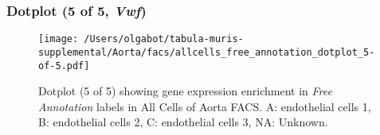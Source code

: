 \clearpage

\subsubsection{Dotplot (5 of 5, \emph{Vwf})}
\begin{figure}[h]
\centering
\texttt{[image: /Users/olgabot/tabula-muris-supplemental/Aorta/facs/allcells\_free\_annotation\_dotplot\_5-of-5.pdf]}

\caption{ Dotplot (5 of 5)  showing gene expression enrichment in \emph{Free Annotation} labels in All Cells of Aorta FACS. A: endothelial cells 1, B: endothelial cells 2, C: endothelial cells 3, NA: Unknown.}
\end{figure}

